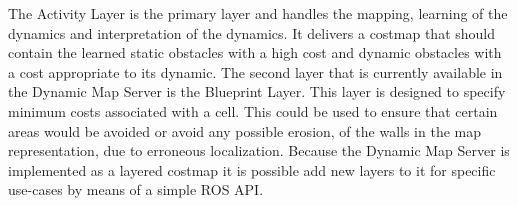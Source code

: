 The Activity Layer is the primary layer and handles the mapping, learning of the dynamics and interpretation of the dynamics. It delivers a costmap that should contain the learned static obstacles with a high cost and dynamic obstacles with a cost appropriate to its dynamic. The second layer that is currently available in the Dynamic Map Server is the Blueprint Layer. This layer is designed to specify minimum costs associated with a cell. This could be used to ensure that certain areas would be avoided or avoid any possible erosion, of the walls in the map representation, due to erroneous localization. Because the Dynamic Map Server is implemented as a layered costmap it is possible add new layers to it for specific use-cases by means of a simple ROS API.